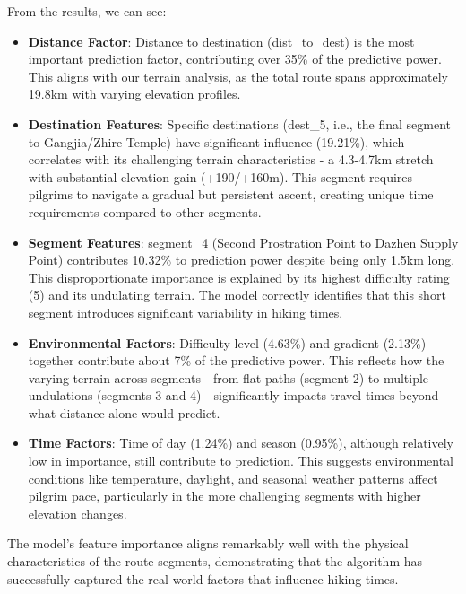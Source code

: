\documentclass[12pt]{article}
\begin{document}
From the results, we can see:

\begin{itemize}
  \item \textbf{Distance Factor}: Distance to destination (dist\_to\_dest) is the most important prediction factor, contributing over 35\% of the predictive power. This aligns with our terrain analysis, as the total route spans approximately 19.8km with varying elevation profiles.
  
  \item \textbf{Destination Features}: Specific destinations (dest\_5, i.e., the final segment to Gangjia/Zhire Temple) have significant influence (19.21\%), which correlates with its challenging terrain characteristics - a 4.3-4.7km stretch with substantial elevation gain (+190/+160m). This segment requires pilgrims to navigate a gradual but persistent ascent, creating unique time requirements compared to other segments.
  
  \item \textbf{Segment Features}: segment\_4 (Second Prostration Point to Dazhen Supply Point) contributes 10.32\% to prediction power despite being only 1.5km long. This disproportionate importance is explained by its highest difficulty rating (5) and its undulating terrain. The model correctly identifies that this short segment introduces significant variability in hiking times.
  
  \item \textbf{Environmental Factors}: Difficulty level (4.63\%) and gradient (2.13\%) together contribute about 7\% of the predictive power. This reflects how the varying terrain across segments - from flat paths (segment 2) to multiple undulations (segments 3 and 4) - significantly impacts travel times beyond what distance alone would predict.
  
  \item \textbf{Time Factors}: Time of day (1.24\%) and season (0.95\%), although relatively low in importance, still contribute to prediction. This suggests environmental conditions like temperature, daylight, and seasonal weather patterns affect pilgrim pace, particularly in the more challenging segments with higher elevation changes.
\end{itemize}

The model's feature importance aligns remarkably well with the physical characteristics of the route segments, demonstrating that the algorithm has successfully captured the real-world factors that influence hiking times.
\end{document}
